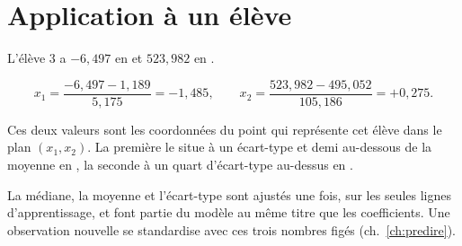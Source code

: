 \section{Application à un élève}

L'élève $3$ a $-6{,}497$ en \Herb et $523{,}982$ en \Runes.

\[
  x_1=\frac{-6{,}497-1{,}189}{5{,}175}=-1{,}485,
  \qquad
  x_2=\frac{523{,}982-495{,}052}{105{,}186}=+0{,}275 .
\]

Ces deux valeurs sont les coordonnées du point qui représente cet élève dans le
plan $(x_1,x_2)$. La première le situe à un écart-type et demi au-dessous de la
moyenne en \Herb, la seconde à un quart d'écart-type au-dessus en \Runes.

\begin{resultat}
La médiane, la moyenne et l'écart-type sont ajustés une fois, sur les seules
lignes d'apprentissage, et font partie du modèle au même titre que les
coefficients. Une observation nouvelle se standardise avec ces trois nombres
figés (ch.~\ref{ch:predire}).
\end{resultat}
